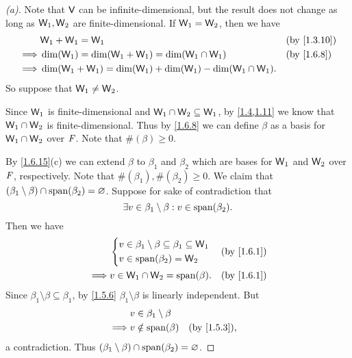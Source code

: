 \begin{proof}[(a)]
	Note that \(\mathsf{V}\) can be infinite-dimensional, but the result does not change as long as \(\mathsf{W}_1, \mathsf{W}_2\) are finite-dimensional.
	If \(\mathsf{W}_1 = \mathsf{W}_2\), then we have
	\begin{align*}
		         & \W_1 + \W_1 = \W_1                                                  &  & \by{1.3.10} \\
		\implies & \dim(\W_1) = \dim(\W_1 + \W_1) = \dim(\W_1 \cap \W_1)               &  & \by{1.6.8}  \\
		\implies & \dim(\W_1 + \W_1) = \dim(\W_1) + \dim(\W_1) - \dim(\W_1 \cap \W_1).
	\end{align*}
	So suppose that \(\mathsf{W}_1 \neq \mathsf{W}_2\).

	Since \(\mathsf{W}_1\) is finite-dimensional and \(\mathsf{W}_1 \cap \mathsf{W}_2 \subseteq \mathsf{W}_1\), by \cref{1.4,1.11} we know that \(\mathsf{W}_1 \cap \mathsf{W}_2\) is finite-dimensional.
	Thus by \cref{1.6.8} we can define \(\beta\) as a basis for \(\mathsf{W}_1 \cap \mathsf{W}_2\) over \(\mathit{F}\).
	Note that \(\#(\beta) \geq 0\).

	By \cref{1.6.15}(c) we can extend \(\beta\) to \(\beta_1\) and \(\beta_2\) which are bases for \(\mathsf{W}_1\) and \(\mathsf{W}_2\) over \(\mathit{F}\), respectively.
	Note that \(\#(\beta_1), \#(\beta_2) \geq 0\).
	We claim that \((\beta_1 \setminus \beta) \cap \spn{\beta_2} = \varnothing\).
	Suppose for sake of contradiction that
	\[
		\exists v \in \beta_1 \setminus \beta : v \in \spn{\beta_2}.
	\]
	Then we have
	\begin{align*}
		         & \begin{dcases}
			           v \in \beta_1 \setminus \beta \subseteq \beta_1 \subseteq \W_1 \\
			           v \in \spn{\beta_2} = \W_2
		           \end{dcases} &  & \by{1.6.1}                    \\
		\implies & v \in \W_1 \cap \W_2 = \spn{\beta}.                               &  & \by{1.6.1}
	\end{align*}
	Since \(\beta_1 \setminus \beta \subseteq \beta_1\), by \cref{1.5.6} \(\beta_1 \setminus \beta\) is linearly independent.
	But
	\begin{align*}
		         & v \in \beta_1 \setminus \beta                  \\
		\implies & v \notin \spn{\beta}          &  & \by{1.5.3},
	\end{align*}
	a contradiction.
	Thus \((\beta_1 \setminus \beta) \cap \spn{\beta_2} = \varnothing\).


\end{proof}
